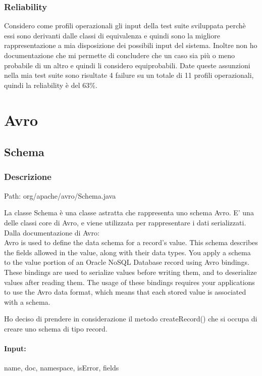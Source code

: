 \documentclass[12pt, a4paper]{article}
\begin{document}
\subsubsection{Reliability}
Considero come profili operazionali gli input della test suite sviluppata perchè essi sono derivanti dalle classi di equivalenza
e quindi sono la migliore rappresentazione a mia disposizione dei possibili input del sistema. Inoltre non ho documentazione che
mi permette di concludere che un caso sia più o meno probabile di un altro e quindi li considero equiprobabili. Date queste 
assunzioni nella mia test suite sono risultate 4 failure su un totale di 11 profili operazionali, quindi la reliability è del 63\%.

\newpage
\section{Avro}
\subsection{Schema}
\subsubsection{Descrizione}
Path: org/apache/avro/Schema.java

La classe Schema è una classe astratta che rappresenta uno schema Avro. E' una delle classi core di Avro, e viene utilizzata
per rappresentare i dati serializzati. \\

Dalla documentazione di Avro: \\

Avro is used to define the data schema for a record's value. 
This schema describes the fields allowed in the value, along with their data types.
You apply a schema to the value portion of an Oracle NoSQL Database record using Avro bindings.
These bindings are used to serialize values before writing them, and to deserialize values after reading them.
The usage of these bindings requires your applications to use the Avro data format, which means that each
stored value is associated with a schema. 

Ho deciso di prendere in considerazione il metodo createRecord() che si occupa di creare uno schema di tipo record.
\paragraph{Input:} name, doc, namespace, isError, fields
\end{document}
